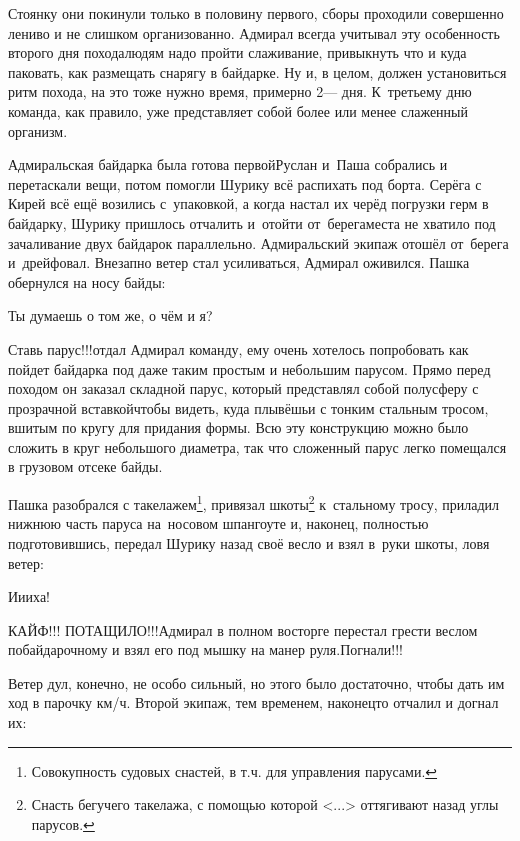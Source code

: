 Стоянку они покинули только в половину первого, сборы проходили совершенно лениво и не слишком организованно. Адмирал всегда учитывал эту особенность второго дня похода\mdash людям надо пройти слаживание, привыкнуть что и куда паковать, как размещать снарягу в байдарке. Ну и, в целом, должен установиться ритм похода, на это тоже нужно время, примерно 2\thinspace\nobreakdash--- дня. К~третьему дню команда, как правило, уже представляет собой более или менее слаженный организм. 

Адмиральская байдарка была готова первой\mdash Руслан и~Паша собрались и перетаскали вещи, потом помогли Шурику всё распихать под борта. Серёга с Кирей всё ещё возились с~упаковкой, а когда настал их черёд погрузки герм в байдарку, Шурику пришлось отчалить и~отойти от~берега\mdash места не хватило под зачаливание двух байдарок параллельно. Адмиральский экипаж отошёл от~берега и~дрейфовал. Внезапно ветер стал усиливаться, Адмирал оживился. Пашка обернулся на носу байды:

\diagdash Ты думаешь о том же, о чём и я?

\diagdash Ставь парус!!!\mdash отдал Адмирал команду, ему очень хотелось попробовать как пойдет байдарка под даже таким простым и небольшим парусом. Прямо перед походом он заказал складной парус, который представлял собой полусферу с прозрачной вставкой\mdash чтобы видеть, куда плывёшь\mdash и с тонким стальным тросом, вшитым по кругу для придания формы. Всю эту конструкцию можно было сложить в круг небольшого диаметра, так что сложенный парус легко помещался в грузовом отсеке байды.

\renewcommand*{\thefootnote}{\arabic{footnote}}
Пашка разобрался с такелажем\footnote{Совокупность судовых снастей, в т.ч. для управления парусами\cite{МорскойСправочник}.}, привязал шкоты\footnote{Снасть бегучего такелажа, с помощью которой <...> оттягивают назад углы парусов\cite{МорскойСправочник}.} к~стальному тросу, приладил нижнюю часть паруса на~носовом шпангоуте и, наконец, полностью подготовившись, передал Шурику назад своё весло и взял в~руки шкоты, ловя ветер:

\diagdash И\sdash и\sdash иха! 

\diagdash КАЙФ!!! ПОТАЩИЛО!!!\mdash Адмирал в полном восторге перестал грести веслом по\sdash байдарочному и взял его под мышку на манер руля.\mdash Погнали!!!

Ветер дул, конечно, не особо сильный, но этого было достаточно, чтобы дать им ход в парочку км/ч. Второй экипаж, тем временем, наконец\sdash то отчалил и догнал их:

